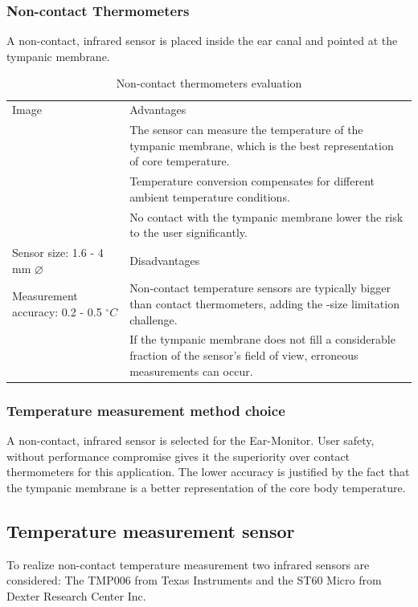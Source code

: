 \subsubsection{Non-contact Thermometers}
A non-contact, infrared sensor is placed inside the ear canal and pointed at the tympanic membrane.

\begin{table}[H]
\caption{Non-contact thermometers evaluation}
\label{tab:NonContactThermometers_Eval}
\renewcommand{\arraystretch}{1.3}	%
\centering
\begin{tabular}{|p{5cm}|p{8cm}|} 
 \hline
 Image 	& 	Advantages  \\ 
		&	\tabitem The sensor can measure the temperature of the tympanic membrane, which is the best representation of core temperature.\\
  		&	\tabitem Temperature conversion compensates for different ambient temperature conditions.\\
  		&	\tabitem No contact with the tympanic membrane lower the risk to the user significantly.\\
\hline
Sensor size: 1.6 - 4 mm ${\diameter}$			&	Disadvantages  \\ 
Measurement accuracy: 0.2 - 0.5  $^{\circ}C$ 	&	\tabitem Non-contact temperature sensors are typically bigger than contact thermometers, adding the -size limitation challenge.\\
  												&	\tabitem If the tympanic membrane does not fill a considerable fraction of the sensor's field of view, erroneous measurements can occur.\\
 
 \hline
\end{tabular}
\end{table}

\subsubsection{Temperature measurement method choice}
A non-contact, infrared sensor is selected for the Ear-Monitor. User safety, without performance compromise gives it the superiority over contact thermometers for this application. The lower accuracy is justified by the fact that the tympanic membrane is a better representation of the core body temperature.

\subsection{Temperature measurement sensor}
To realize non-contact temperature measurement two infrared sensors are considered: The TMP006 from Texas Instruments and the ST60 Micro from Dexter Research Center Inc.


